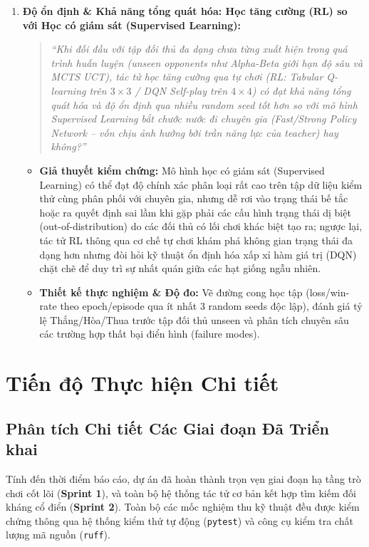 \documentclass[a4paper,12pt]{report}
\begin{document}
\begin{enumerate}[label=\textbf{RQ\arabic*:}, leftmargin=1.5cm, start=1]
    \item \textbf{Độ ổn định \& Khả năng tổng quát hóa: Học tăng cường (RL) so với Học có giám sát (Supervised Learning):}
    \begin{quote}
        \textit{``Khi đối đầu với tập đối thủ đa dạng chưa từng xuất hiện trong quá trình huấn luyện (unseen opponents như Alpha-Beta giới hạn độ sâu và MCTS UCT), tác tử học tăng cường qua tự chơi (RL: Tabular Q-learning trên $3 \times 3$ / DQN Self-play trên $4 \times 4$) có đạt khả năng tổng quát hóa và độ ổn định qua nhiều random seed tốt hơn so với mô hình Supervised Learning bắt chước nước đi chuyên gia (Fast/Strong Policy Network -- vốn chịu ảnh hưởng bởi trần năng lực của teacher) hay không?''}
    \end{quote}
    \begin{itemize}
        \item \textbf{Giả thuyết kiểm chứng:} Mô hình học có giám sát (Supervised Learning) có thể đạt độ chính xác phân loại rất cao trên tập dữ liệu kiểm thử cùng phân phối với chuyên gia, nhưng dễ rơi vào trạng thái bế tắc hoặc ra quyết định sai lầm khi gặp phải các cấu hình trạng thái dị biệt (out-of-distribution) do các đối thủ có lối chơi khác biệt tạo ra; ngược lại, tác tử RL thông qua cơ chế tự chơi khám phá không gian trạng thái đa dạng hơn nhưng đòi hỏi kỹ thuật ổn định hóa xấp xỉ hàm giá trị (DQN) chặt chẽ để duy trì sự nhất quán giữa các hạt giống ngẫu nhiên.
        \item \textbf{Thiết kế thực nghiệm \& Độ đo:} Vẽ đường cong học tập (loss/win-rate theo epoch/episode qua ít nhất 3 random seeds độc lập), đánh giá tỷ lệ Thắng/Hòa/Thua trước tập đối thủ unseen và phân tích chuyên sâu các trường hợp thất bại điển hình (failure modes).
    \end{itemize}
\end{enumerate}

\clearpage
\section{Tiến độ Thực hiện Chi tiết}

\subsection{Phân tích Chi tiết Các Giai đoạn Đã Triển khai}
Tính đến thời điểm báo cáo, dự án đã hoàn thành trọn vẹn giai đoạn hạ tầng trò chơi cốt lõi (\textbf{Sprint 1}), và toàn bộ hệ thống tác tử cơ bản kết hợp tìm kiếm đối kháng cổ điển (\textbf{Sprint 2}). Toàn bộ các mốc nghiệm thu kỹ thuật đều được kiểm chứng thông qua hệ thống kiểm thử tự động (\texttt{pytest}) và công cụ kiểm tra chất lượng mã nguồn (\texttt{ruff}).
\end{document}
